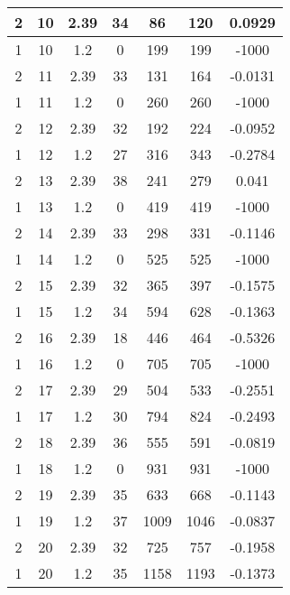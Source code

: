 \documentclass[letterpaper, 12pt]{article}
\begin{document}
\begin{longtable}{|c|c|c|c|c|c|c|}
\hline
2 & 10 & 2.39 & 34 & 86 & 120 & 0.0929 \\
\hline
1 & 10 & 1.2 & 0 & 199 & 199 & -1000 \\
\hline
2 & 11 & 2.39 & 33 & 131 & 164 & -0.0131 \\
\hline
1 & 11 & 1.2 & 0 & 260 & 260 & -1000 \\
\hline
2 & 12 & 2.39 & 32 & 192 & 224 & -0.0952 \\
\hline
1 & 12 & 1.2 & 27 & 316 & 343 & -0.2784 \\
\hline
2 & 13 & 2.39 & 38 & 241 & 279 & 0.041 \\
\hline
1 & 13 & 1.2 & 0 & 419 & 419 & -1000 \\
\hline
2 & 14 & 2.39 & 33 & 298 & 331 & -0.1146 \\
\hline
1 & 14 & 1.2 & 0 & 525 & 525 & -1000 \\
\hline
2 & 15 & 2.39 & 32 & 365 & 397 & -0.1575 \\
\hline
1 & 15 & 1.2 & 34 & 594 & 628 & -0.1363 \\
\hline
2 & 16 & 2.39 & 18 & 446 & 464 & -0.5326 \\
\hline
1 & 16 & 1.2 & 0 & 705 & 705 & -1000 \\
\hline
2 & 17 & 2.39 & 29 & 504 & 533 & -0.2551 \\
\hline
1 & 17 & 1.2 & 30 & 794 & 824 & -0.2493 \\
\hline
2 & 18 & 2.39 & 36 & 555 & 591 & -0.0819 \\
\hline
1 & 18 & 1.2 & 0 & 931 & 931 & -1000 \\
\hline
2 & 19 & 2.39 & 35 & 633 & 668 & -0.1143 \\
\hline
1 & 19 & 1.2 & 37 & 1009 & 1046 & -0.0837 \\
\hline
2 & 20 & 2.39 & 32 & 725 & 757 & -0.1958 \\
\hline
1 & 20 & 1.2 & 35 & 1158 & 1193 & -0.1373 \\
\hline
\end{longtable}
\end{document}
